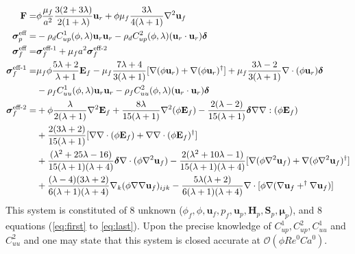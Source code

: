 \begin{align}
    \textbf{F}=&
    \phi
    \frac{\mu_f}{a^2}
    \frac{3(2+3\lambda)}{2(1+\lambda)}\textbf{u}_r
    + \phi\mu_f  \frac{3\lambda}{4(\lambda +1)} \mathbf{\nabla}^2 \textbf{u}_f\\
    \bm\sigma_p^\text{eff}
    =&
    -\rho_d C^1_{up}(\phi,\lambda) \textbf{u}_r \textbf{u}_r
    -\rho_d C^2_{up}(\phi,\lambda) (\textbf{u}_r \cdot \textbf{u}_r)\bm\delta\\
    \bm\sigma_f^\text{eff}
    =&
    \bm\sigma_f^\text{eff-1}
    + \mu_f a^2 \bm\sigma_f^\text{eff-2} \\
    \bm\sigma_f^\text{eff-1}
    =&
     \mu_f \phi \frac{5\lambda +2}{\lambda+1} \textbf{E}_f
    - \mu_f \frac{7\lambda +4}{3(\lambda+1)} [
    \mathbf{\nabla}(\phi \textbf{u}_r)
    + \mathbf{\nabla}(\phi \textbf{u}_r)^\dagger]
    + \mu_f \frac{3\lambda - 2}{3(\lambda+1)} \mathbf{\nabla}\cdot(\phi \textbf{u}_r)  \bm\delta\nonumber\\
    &-\rho_f C^1_{uu}(\phi,\lambda)  \textbf{u}_r \textbf{u}_r
    -\rho_f C^2_{uu} (\phi,\lambda) (\textbf{u}_r \cdot \textbf{u}_r)\bm\delta\\
    \bm\sigma_f^\text{eff-2}
    =&
    +  \phi \frac{\lambda}{2(\lambda+1)}\mathbf{\nabla}^2 \textbf{E}_f
    +  \frac{8\lambda}{15(\lambda+1)}\mathbf{\nabla}^2(\phi \textbf{E}_f)
    -  \frac{2(\lambda-2)}{15(\lambda+1)}\bm\delta \mathbf{\nabla}\mathbf{\nabla} : (\phi \textbf{E}_f)
    \nonumber
    \\
    &
    + \frac{2(3\lambda+2)}{15(\lambda+1)} 
    [\mathbf{\nabla}\mathbf{\nabla}\cdot(\phi \textbf{E}_f)
    + \mathbf{\nabla}\mathbf{\nabla}\cdot(\phi \textbf{E}_f)^\dagger]\nonumber\\
    &+ \frac{(\lambda^2+25\lambda-16)}{15(\lambda+1)(\lambda+4)}\bm\delta \mathbf{\nabla}\cdot (\phi  \mathbf{\nabla}^2\textbf{u}_f)
    - \frac{2(\lambda^2+10\lambda-1)}{15(\lambda+1)(\lambda+4)} 
    [\mathbf{\nabla}(\phi \mathbf{\nabla}^2\textbf{u}_f)
    +\mathbf{\nabla}(\phi \mathbf{\nabla}^2\textbf{u}_f)^\dagger]
    \nonumber\\
    &
    +\frac{(\lambda-4)(3\lambda+2)}{6(\lambda+1)(\lambda+4)} \mathbf{\nabla}_k (\phi \mathbf{\nabla}\mathbf{\nabla} \textbf{u}_f)_{ijk}
    - \frac{5\lambda(\lambda+2)}{6(\lambda+1)(\lambda+4)}
    \mathbf{\nabla}\cdot [\phi \mathbf{\nabla}(\mathbf{\nabla} \textbf{u}_f+^\dagger\mathbf{\nabla} \textbf{u}_f)]
\end{align}
This system is constituted of 8 unknown ($\phi_f,\phi,\textbf{u}_f,p_f,\textbf{u}_p,\textbf{H}_p,\textbf{S}_p,\bm\mu_p$), and 8 equations (\ref{eq:first} to \ref{eq:last}).  
Upon the precise knowledge of $C^1_{up}, C^2_{up}, C^1_{uu}$ and $C^2_{uu}$ and one may state that this system is closed accurate at $\mathcal{O}(\phi Re^0 Ca^0)$. 

